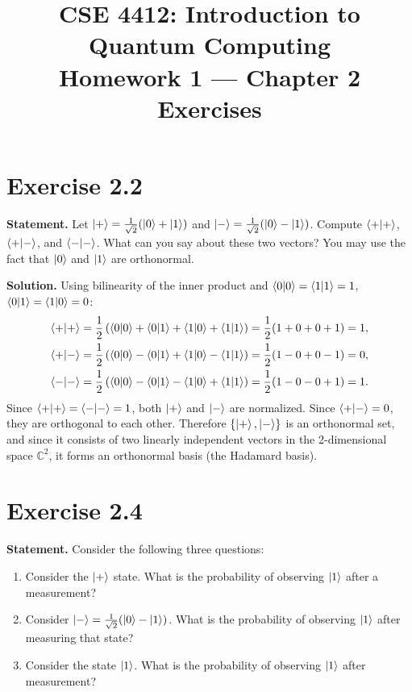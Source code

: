 \documentclass[11pt]{article}
\title{CSE 4412: Introduction to Quantum Computing \\ Homework 1 --- Chapter 2 Exercises}
\author{}
\date{}
\begin{document}
\maketitle

\section*{Exercise 2.2}
\textbf{Statement.} Let $\ket{+} = \frac{1}{\sqrt{2}}(\ket{0} + \ket{1})$ and $\ket{-} = \frac{1}{\sqrt{2}}(\ket{0} - \ket{1})$. Compute $\braket{+|+}$, $\braket{+|-}$, and $\braket{-|-}$. What can you say about these two vectors? You may use the fact that $\ket{0}$ and $\ket{1}$ are orthonormal.

\textbf{Solution.} Using bilinearity of the inner product and $\braket{0|0} = \braket{1|1} = 1$, $\braket{0|1} = \braket{1|0} = 0$:
\begin{align*}
\braket{+|+} &= \frac{1}{2}\left(\braket{0|0} + \braket{0|1} + \braket{1|0} + \braket{1|1}\right) = \frac{1}{2}(1 + 0 + 0 + 1) = 1, \\
\braket{+|-} &= \frac{1}{2}\left(\braket{0|0} - \braket{0|1} + \braket{1|0} - \braket{1|1}\right) = \frac{1}{2}(1 - 0 + 0 - 1) = 0, \\
\braket{-|-} &= \frac{1}{2}\left(\braket{0|0} - \braket{0|1} - \braket{1|0} + \braket{1|1}\right) = \frac{1}{2}(1 - 0 - 0 + 1) = 1.
\end{align*}
Since $\braket{+|+} = \braket{-|-} = 1$, both $\ket{+}$ and $\ket{-}$ are normalized. Since $\braket{+|-} = 0$, they are orthogonal to each other. Therefore $\{\ket{+}, \ket{-}\}$ is an orthonormal set, and since it consists of two linearly independent vectors in the 2-dimensional space $\mathbb{C}^2$, it forms an orthonormal basis (the Hadamard basis).

\section*{Exercise 2.4}
\textbf{Statement.} Consider the following three questions:
\begin{enumerate}
    \item Consider the $\ket{+}$ state. What is the probability of observing $\ket{1}$ after a measurement?
    \item Consider $\ket{-} = \frac{1}{\sqrt{2}}(\ket{0} - \ket{1})$. What is the probability of observing $\ket{1}$ after measuring that state?
    \item Consider the state $\ket{1}$. What is the probability of observing $\ket{1}$ after measurement?
\end{enumerate}
\end{document}
